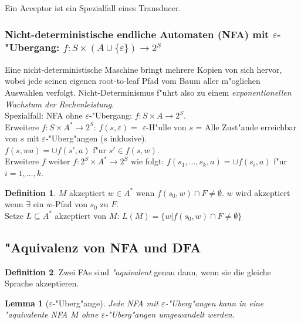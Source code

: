 \documentclass[german, 10pt, a4paper, twocolumn]{scrartcl}
\newtheorem{lemma}{Lemma}[section]
\theoremstyle{definition}
\newtheorem*{definition}{Definition}
\theoremstyle{example}
\begin{document}
Ein Acceptor ist ein Spezialfall eines Transducer.

\subsubsection{Nicht-deterministische endliche Automaten (NFA) mit $\varepsilon$-"Ubergang: $f:S\times (A \cup \{\varepsilon\}) \to 2^{S}$ }

Eine nicht-deterministische Maschine bringt mehrere Kopien von sich hervor, wobei jede seinen eigenen root-to-leaf Pfad vom Baum aller m"oglichen Auswahlen verfolgt. Nicht-Determinismus f"uhrt also zu einem \textit{exponentionellen Wachstum der Rechenleistung}.\\

Spezialfall: NFA ohne $\varepsilon$-"Ubergang: $f:S\times A \to 2^{S}$.\\

Erweitere $f: S \times A^* \to 2^{S}$: $f(s,\varepsilon)=$ $\varepsilon$-H"ulle von $s$ = Alle Zust"ande erreichbar von $s$ mit $\varepsilon$-"Uberg"angen ($s$ inklusive).\\

$f(s,wa) = \cup f(s', a)$ f"ur $s' \in f(s,w)$.\\

Erweitere $f$ weiter $f: 2^{S} \times A^* \to 2^{S}$ wie folgt: $f(s_1,\ldots, s_k, a) = \cup f(s_i, a)$ f"ur $i=1,\ldots, k$.

\begin{definition}
	$M$ akzeptiert $w \in A^*$ wenn $f(s_0, w) \cap F \neq \emptyset$. $w$ wird akzeptiert wenn $\exists$ ein $w$-Pfad von $s_0$ zu $F$.\\
	Setze $L\subseteq A^*$ akzeptiert von $M$: $L(M) = \{ w | f(s_0, w) \cap F \neq \emptyset \}$
\end{definition}

\subsection{"Aquivalenz von NFA und DFA}

\begin{definition}
	Zwei FAs sind \textit{"aquivalent} genau dann, wenn sie die gleiche Sprache akzeptieren.
\end{definition}

\begin{lemma}[$\varepsilon$-"Uberg"ange]
	Jede NFA mit $\varepsilon$-"Uberg"angen kann in eine "aquivalente NFA $M$ ohne $\varepsilon$-"Uberg"angen umgewandelt werden.
\end{lemma}
\end{document}
